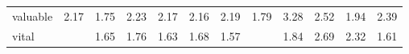\begin{tabular}{|l|c|c|c|c|c|c|c|c|c|c|c|}
valuable & \cellcolor{yellow!43} 2.17 & \cellcolor{yellow!35} 1.75 & \cellcolor{yellow!44} 2.23 & \cellcolor{yellow!43} 2.17 & \cellcolor{yellow!43} 2.16 & \cellcolor{yellow!43} 2.19 & \cellcolor{yellow!35} 1.79 & \cellcolor{yellow!65} 3.28 & \cellcolor{yellow!50} 2.52 & \cellcolor{yellow!38} 1.94 & \cellcolor{yellow!47} 2.39 \\
vital &  & \cellcolor{yellow!32} 1.65 & \cellcolor{yellow!35} 1.76 & \cellcolor{yellow!32} 1.63 & \cellcolor{yellow!33} 1.68 & \cellcolor{yellow!31} 1.57 &  & \cellcolor{yellow!36} 1.84 & \cellcolor{yellow!53} 2.69 & \cellcolor{yellow!46} 2.32 & \cellcolor{yellow!32} 1.61 \\
\bottomrule
\end{tabular}
